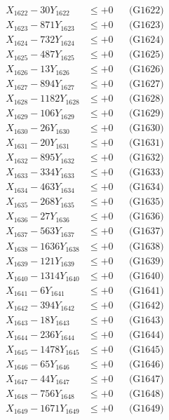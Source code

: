 \documentclass[a4paper,10pt]{article}
\begin{document}
{\begin{align}
X_{1622} - 30Y_{1622} &\leq +0 && \text{(G1622)} \\
X_{1623} - 871Y_{1623} &\leq +0 && \text{(G1623)} \\
X_{1624} - 732Y_{1624} &\leq +0 && \text{(G1624)} \\
X_{1625} - 487Y_{1625} &\leq +0 && \text{(G1625)} \\
X_{1626} - 13Y_{1626} &\leq +0 && \text{(G1626)} \\
X_{1627} - 894Y_{1627} &\leq +0 && \text{(G1627)} \\
X_{1628} - 1182Y_{1628} &\leq +0 && \text{(G1628)} \\
X_{1629} - 106Y_{1629} &\leq +0 && \text{(G1629)} \\
X_{1630} - 26Y_{1630} &\leq +0 && \text{(G1630)} \\
\allowbreak
X_{1631} - 20Y_{1631} &\leq +0 && \text{(G1631)} \\
X_{1632} - 895Y_{1632} &\leq +0 && \text{(G1632)} \\
X_{1633} - 334Y_{1633} &\leq +0 && \text{(G1633)} \\
X_{1634} - 463Y_{1634} &\leq +0 && \text{(G1634)} \\
X_{1635} - 268Y_{1635} &\leq +0 && \text{(G1635)} \\
X_{1636} - 27Y_{1636} &\leq +0 && \text{(G1636)} \\
X_{1637} - 563Y_{1637} &\leq +0 && \text{(G1637)} \\
X_{1638} - 1636Y_{1638} &\leq +0 && \text{(G1638)} \\
X_{1639} - 121Y_{1639} &\leq +0 && \text{(G1639)} \\
X_{1640} - 1314Y_{1640} &\leq +0 && \text{(G1640)} \\
\allowbreak
X_{1641} - 6Y_{1641} &\leq +0 && \text{(G1641)} \\
X_{1642} - 394Y_{1642} &\leq +0 && \text{(G1642)} \\
X_{1643} - 18Y_{1643} &\leq +0 && \text{(G1643)} \\
X_{1644} - 236Y_{1644} &\leq +0 && \text{(G1644)} \\
X_{1645} - 1478Y_{1645} &\leq +0 && \text{(G1645)} \\
X_{1646} - 65Y_{1646} &\leq +0 && \text{(G1646)} \\
X_{1647} - 44Y_{1647} &\leq +0 && \text{(G1647)} \\
X_{1648} - 756Y_{1648} &\leq +0 && \text{(G1648)} \\
X_{1649} - 1671Y_{1649} &\leq +0 && \text{(G1649)} \\

\end{align}}
\end{document}
